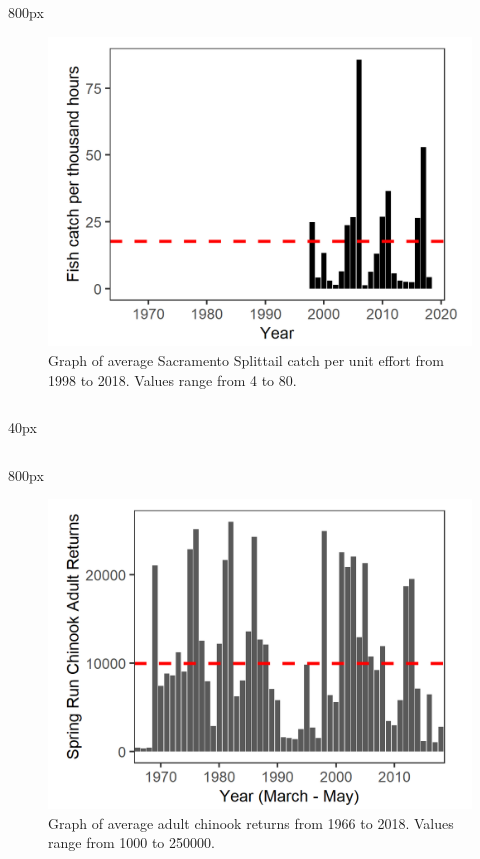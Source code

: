 \documentclass[
]{book}
\begin{document}
\begin{column}{800px\textwidth}
\begin{figure}
\includegraphics[width=15.25in]{figures/yolo_splittail} \caption{Graph of average Sacramento Splittail catch per unit effort from 1998 to 2018. Values range from 4 to 80.}\label{fig:unnamed-chunk-35}
\end{figure}
\end{column}

\begin{column}{40px\textwidth}
~
\end{column}

\begin{column}{800px\textwidth}
\begin{figure}
\includegraphics[width=15.25in]{figures/SpringRun_1966} \caption{Graph of average adult chinook returns from 1966 to 2018. Values range from 1000 to 250000.}\label{fig:unnamed-chunk-36}
\end{figure}
\end{column}
\end{document}
